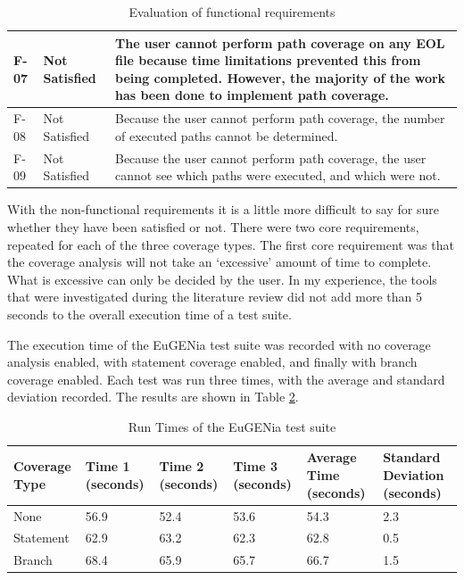 \begin{table}[h]
\begin{tabular}{|l|l|p{4.5in}|}
    F-07        & Not Satisfied & The user cannot perform path coverage on any EOL file because time limitations prevented this from being completed. However, the majority of the work has been done to implement path coverage. \\\hline
    F-08        & Not Satisfied & Because the user cannot perform path coverage, the number of executed paths cannot be determined.                                                                                               \\\hline
    F-09        & Not Satisfied & Because the user cannot perform path coverage, the user cannot see which paths were executed, and which were not.                                                                               \\\hline
    \end{tabular}
    \caption{Evaluation of functional requirements}
    \label{tab:Functional}
\end{table}

With the non-functional requirements it is a little more difficult to say for sure whether they have been satisfied or not. There were two core requirements, repeated for each of the three coverage types. The first core requirement was that the coverage analysis will not take an `excessive' amount of time to complete. What is excessive can only be decided by the user. In my experience, the tools that were investigated during the literature review did not add more than 5 seconds to the overall execution time of a test suite.


The execution time of the EuGENia test suite was recorded with no coverage analysis enabled, with statement coverage enabled, and finally with branch coverage enabled. Each test was run three times, with the average and standard deviation recorded. The results are shown in Table \ref{tab:runTimes}.

\begin{table}[h]
\centering
    \begin{tabular}{|p{1in} | p{0.6in} |p{0.6in} |p{0.6in} |p{0.6in} |p{0.8in} |} \hline
    Coverage Type & Time 1 (seconds) & Time 2 (seconds) & Time 3 (seconds) & Average Time (seconds) & Standard Deviation (seconds) \\\hline
    None          & 56.9             & 52.4             & 53.6             & 54.3                   & 2.3                          \\\hline
    Statement     & 62.9             & 63.2             & 62.3             & 62.8                   & 0.5                          \\\hline
    Branch        & 68.4             & 65.9             & 65.7             & 66.7                   & 1.5                          \\\hline
    \end{tabular}
    \caption{Run Times of the EuGENia test suite}
    \label{tab:runTimes}
\end{table}

